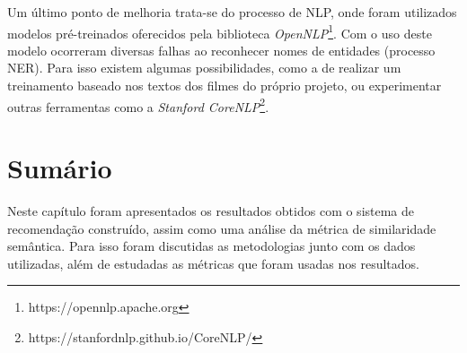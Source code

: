 Um último ponto de melhoria trata-se do processo de \ac{NLP}, onde foram utilizados modelos pré-treinados oferecidos pela biblioteca \textit{OpenNLP}\footnote{https://opennlp.apache.org}. Com o uso deste modelo ocorreram diversas falhas ao reconhecer nomes de entidades (processo \ac{NER}). Para isso existem algumas possibilidades, como a de realizar um treinamento baseado nos textos dos filmes do próprio projeto, ou experimentar outras ferramentas como a \textit{Stanford CoreNLP}\footnote{https://stanfordnlp.github.io/CoreNLP/}.

\section{Sumário}

Neste capítulo foram apresentados os resultados obtidos com o sistema de recomendação construído, assim como uma análise da métrica de similaridade semântica. Para isso foram discutidas as metodologias junto com os dados utilizadas, além de estudadas as métricas que foram usadas nos resultados.
